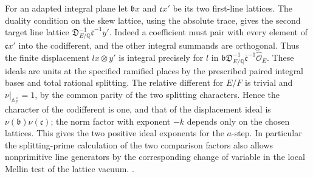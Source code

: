 For an adapted integral plane let \(\mathfrak b x\) and
\(\mathfrak c x'\) be its two first-line lattices. The duality
condition on the skew lattice, using the absolute trace, gives
the second target line lattice
\(\mathfrak D_{E/\mathbb Q}^{-1}\bar{\mathfrak c}^{-1}y'\).
Indeed a coefficient must pair with every element of
\(\mathfrak c x'\) into the codifferent, and the other integral
summands are orthogonal. Thus the finite displacement
\(l x\otimes y'\) is integral precisely for \(l\) in
\(\mathfrak b\mathfrak D_{E/\mathbb Q}^{-1}
  \bar{\mathfrak c}^{-1}\widehat{\mathcal O}_E\).
These ideals are units at the specified ramified places by the
prescribed paired integral bases and total rational splitting.
The relative different for \(E/F\) is trivial and
\(\nu|_{\mathbb A_F^\times}=1\), by the common parity of the
two splitting characters. Hence the character of the codifferent
is one, and that of the displacement ideal is
\(\nu(\mathfrak b)\nu(\mathfrak c)\); the norm factor with
exponent \(-k\) depends only on the chosen lattices. This gives
the two positive ideal exponents for the \(a\)-step. In particular
the splitting-prime calculation of the two comparison factors also
allows nonprimitive line generators by the corresponding change of
variable in the local Mellin test of the lattice vacuum.
.


